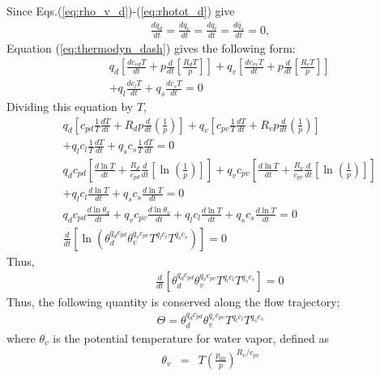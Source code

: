 Since Eqs.(\ref{eq:rho_v_d})-(\ref{eq:rhotot_d}) give
\begin{eqnarray}
  \frac{d q_d}{dt} = \frac{d q_v}{dt} = \frac{d q_l}{dt} = \frac{d q_s}{dt} = 0,
\end{eqnarray}
Equation (\ref{eq:thermodyn_dash}) gives the following form:
\begin{eqnarray}
&& q_d  \left[\frac{d  c_{vd}   T}{dt} +  p \frac{d}{dt} \left[\frac{ R_d T}{p}\right]\right]
+q_v \left[\frac{d  c_{vv}   T}{dt} + p \frac{d}{dt} \left[\frac{ R_v T}{p}\right]\right]\nonumber\\
&&+ q_l  \frac{d  c_{l}   T}{dt} + q_s  \frac{d  c_{s}   T}{dt} =0
\end{eqnarray}
Dividing this equation by $T$,
\begin{eqnarray}
&&q_d  \left[c_{pd} \frac{1}{T}\frac{d T}{dt}
+  R_d p \frac{d}{dt} \left(\frac{1}{p}\right)\right]
+q_v  \left[c_{pv} \frac{1}{T}\frac{d T}{dt}
+  R_v p \frac{d}{dt} \left(\frac{1}{p}\right)\right]\nonumber\\
&&+ q_l c_{l} \frac{1}{T}  \frac{d   T}{dt}
  + q_s c_{s} \frac{1}{T}  \frac{d   T}{dt} =0\\
&&q_d c_{pd} \left[ \frac{d \ln T}{dt}
+  \frac{R_d}{c_{pd}} \frac{d}{dt} \left[\ln \left(\frac{1}{p}\right)\right]\right]
+q_v c_{pv}  \left[\frac{d \ln T}{dt}
+  \frac{R_v}{c_{pv}} \frac{d}{dt} \left[\ln \left(\frac{1}{p}\right)\right]\right]\nonumber\\
&&+ q_l c_{l}  \frac{d \ln T}{dt}
  + q_s c_{s}  \frac{d \ln T}{dt} =0 \label{eq:thermdyn2}\\
&&
 q_d c_{pd} \frac{d \ln \theta_d}{dt}
+q_v c_{pv} \frac{d \ln \theta_v}{dt}
+q_l c_l   \frac{d \ln T}{dt}
+q_s c_s   \frac{d  \ln T}{dt}=0\\
&&
\frac{d}{dt}\left[ \ln \left(
\theta_d^{q_d c_{pd}} \theta_v^{q_v c_{pv}} T^{q_l c_l} T^{q_s c_s}
\right)\right] = 0 \label{eq:lnThetaconserveation}
\end{eqnarray}
Thus,
\begin{eqnarray}
&&\frac{d}{dt}\left[
\theta_d^{q_d c_{pd}} \theta_v^{q_v c_{pv}} T^{q_l c_l} T^{q_s c_s}
\right] = 0
\end{eqnarray}
Thus, the following quantity is conserved along the flow trajectory;
\begin{eqnarray}
\Theta = \theta_d^{q_d c_{pd}} \theta_v^{q_v c_{pv}} T^{q_l c_l} T^{q_s c_s}
\end{eqnarray}
where $\theta_v$ is the potential temperature for water vapor, defined as
\begin{eqnarray}
\theta_v &=& T \left(\frac{p_{00}}{p}\right)^{R_v/c_{pv}}
\end{eqnarray}

